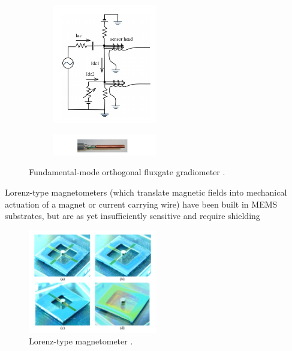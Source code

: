 \begin{figure}[h]
  \centering
  \begin{subfigure}
    \centering
    \includegraphics[width=0.5\textwidth]{fmofg}
  \end{subfigure}
  \begin{subfigure}
    \centering
    \includegraphics[width=0.5\textwidth]{fmofg2}
  \end{subfigure}
\caption{Fundamental-mode orthogonal fluxgate gradiometer \cite{sasada2014fundamental}.}
\label{fig:fmofg}
\end{figure}
Lorenz-type magnetometers (which translate magnetic fields into mechanical actuation of a magnet or current carrying wire) have been built in MEMS substrates, but are as yet insufficiently sensitive and require shielding \cite{sinha201627,kyynarainen20083d,kumar2015ultra,thompson2009parametrically}

\begin{figure}[h]
\centering
\includegraphics[width=0.5\textwidth]{lorenz}
\caption{Lorenz-type magnetometer \cite{sinha201627}.}
\label{fig:nd_lorenz}
\end{figure}

